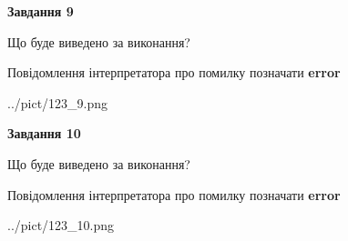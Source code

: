 \documentclass[12pt, ukrainian]{article}
\begin{document}
{{\begin {center}\textbf{Завдання 9}\end {center}}\par
Що буде виведено за виконання? \par
Повідомлення інтерпретатора про помилку позначати \textbf{error}

\begin{center}
	{../pict/123_9.png}
\end{center}
\newpage

{\begin {center}\textbf{Завдання 10}\end {center}}\par
Що буде виведено за виконання? \par
Повідомлення інтерпретатора про помилку позначати \textbf{error}

\begin{center}
	{../pict/123_10.png}
\end{center}
\newpage

}
\end{document}
